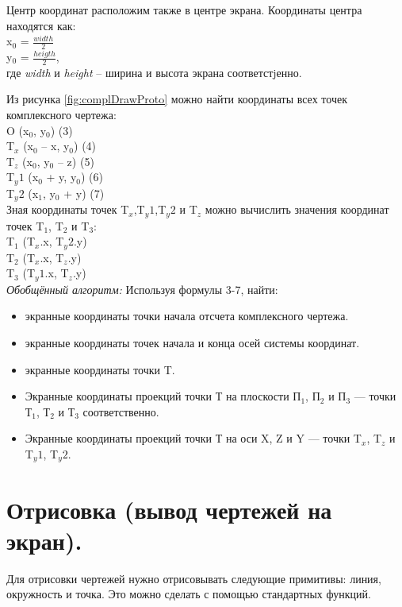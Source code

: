 \documentclass[13pt]{extarticle}
\begin{document}
Центр координат расположим также в центре экрана. Координаты центра находятся как:\\
x$_0$ = $\frac{width}{2}$
\\
y$_0$ = $\frac{heigth}{2}$,\\
где \emph{width} и \emph{height} -- ширина и высота экрана соответстjенно.

Из рисунка \ref{fig:complDrawProto} можно найти координаты всех точек комплексного чертежа:\\
	O (x$_0$, y$_0$) (3)\\
	T$_x$ (x$_0$ -- x, y$_0$) (4)\\
	T$_z$ (x$_0$, y$_0$ -- z) (5)\\
	T$_y1$ (x$_0$ + y, y$_0$) (6)\\
	T$_y2$ (x$_1$, y$_0$ + y) (7)\\
	
Зная координаты точек T$_x$,T$_y1$,T$_y2$ и  T$_z$ можно вычислить значения координат точек  T$_1$, T$_2$ и T$_3$:\\
	T$_1$ (T$_x$.x, T$_y2$.y) \\
	T$_2$ (T$_x$.x, T$_z$.y) \\
	T$_3$ (T$_y1$.x, T$_z$.y) \\
	
\emph{Обобщённый алгоритм:}
Используя формулы 3-7, найти:
	\begin{itemize}
		\item экранные координаты точки начала отсчета комплексного чертежа.
		\item экранные координаты точек начала и конца осей системы координат.
		\item экранные координаты точки T.
		\item Экранные координаты проекций точки Т на плоскости П$_1$, П$_2$ и П$_3$ — точки Т$_1$, Т$_2$ и Т$_3$ соответственно.
		\item Экранные координаты проекций точки Т на оси X, Z и Y — точки T$_x$, T$_z$ и T$_y1$, T$_y2$.
	\end{itemize}
	
\section{Отрисовка (вывод чертежей на экран).}
Для отрисовки чертежей нужно отрисовывать следующие примитивы: линия, окружность и точка. Это можно сделать с помощью стандартных функций.
\end{document}
